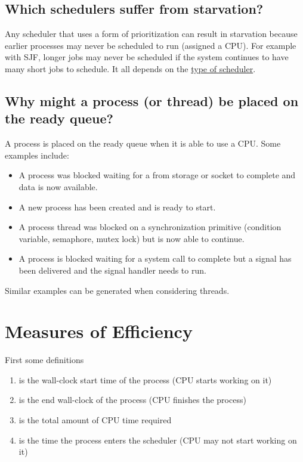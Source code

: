 \subsection{Which schedulers suffer from starvation?}

Any scheduler that uses a form of prioritization can result in starvation because earlier processes may never be scheduled to run (assigned a CPU). For example with SJF, longer jobs may never be scheduled if the system continues to have many short jobs to schedule. It all depends on the \href{https://en.wikipedia.org/wiki/Scheduling_(computing)\#Types_of_operating_system_schedulers}{type of scheduler}.

\subsection{Why might a process (or thread) be placed on the ready queue?}

A process is placed on the ready queue when it is able to use a CPU. Some examples include: 

\begin{itemize}
  \tightlist
\item A process was blocked waiting for a  from storage or socket to complete and data is now available. 
\item A new process has been created and is ready to start. 
\item A process thread was blocked on a synchronization primitive (condition variable, semaphore, mutex lock) but is now able to continue. 
\item A process is blocked waiting for a system call to complete but a signal has been delivered and the signal handler needs to run.
\end{itemize}
Similar examples can be generated when considering threads.

\section{Measures of Efficiency}

First some definitions

\begin{enumerate}
  \item {} is the wall-clock start time of the process (CPU starts working on it)
  \item {} is the end wall-clock of the process (CPU finishes the process)
  \item {} is the total amount of CPU time required
  \item {} is the time the process enters the scheduler (CPU may not start working on it)
\end{enumerate} 

